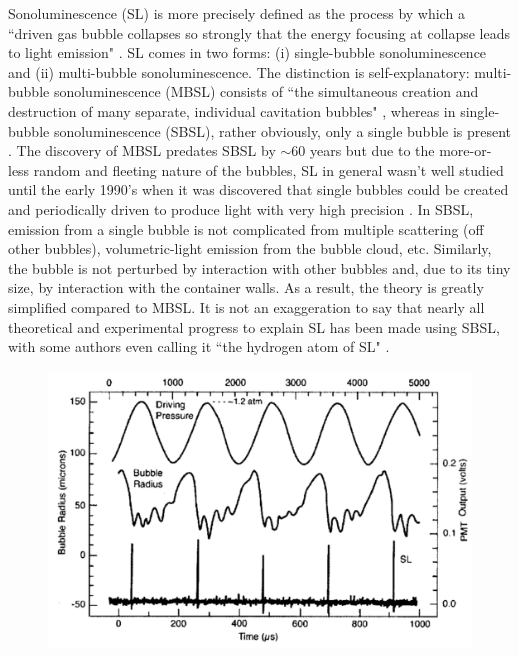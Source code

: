 \documentclass[rmp,aps,nofootinbib,superscriptaddress,floatfix]{revtex4-2}
\begin{document}
Sonoluminescence (SL) is more precisely defined as the process by which a ``driven gas bubble collapses so strongly that the energy focusing at collapse leads to light emission" \cite{brenner2002single}. SL comes in two forms: (i) single-bubble sonoluminescence and (ii) multi-bubble sonoluminescence. The distinction is self-explanatory: multi-bubble sonoluminescence (MBSL) consists of  ``the simultaneous creation and destruction of many separate, individual cavitation bubbles" \cite{crum1994sonoluminescence,brenner2002single}, whereas in single-bubble sonoluminescence (SBSL), rather obviously, only a single bubble is present \cite{gaitan1992sonoluminescence}. The discovery of MBSL predates SBSL by $\sim$60 years but due to the more-or-less random and fleeting nature of the bubbles, SL in general wasn't well studied until the early 1990's when it was discovered that single bubbles could be created and periodically driven to produce light with very high precision \cite{crum1994sonoluminescence,gaitan1990experimental,gaitan1992sonoluminescence,brenner2002single}. In SBSL, emission from a single bubble is not complicated from multiple scattering (off other bubbles), volumetric-light emission from the bubble cloud, etc. Similarly, the bubble is not perturbed by interaction with other bubbles and, due to its tiny size, by interaction with the container walls. As a result, the theory is greatly simplified compared to MBSL. It is not an exaggeration to say that nearly all theoretical and experimental progress to explain SL has been made using SBSL, with some authors even calling it ``the hydrogen atom of SL" \cite{lohse2018bubble,crum1994sonoluminescence}. 

\begin{figure}
\includegraphics[width=0.6\linewidth]{figs/pulses}
    \caption{\cite{brenner2002single,crum1994sonoluminescence}}
\label{fig:pulses}
\end{figure}
\end{document}
